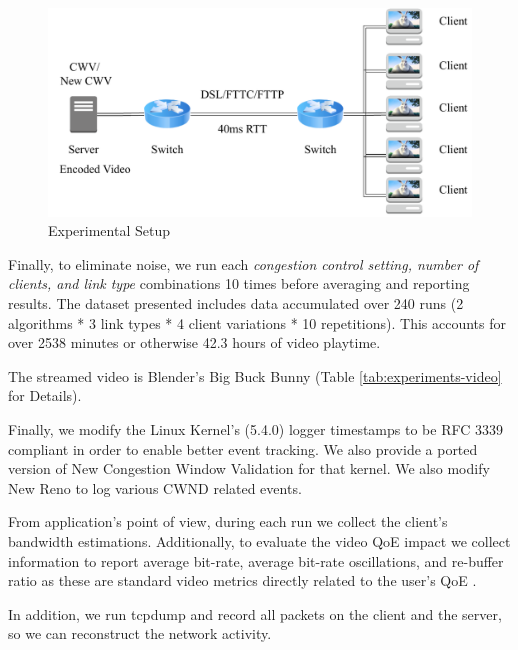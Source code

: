 \documentclass[10pt,sigconf]{acmart}
\begin{document}
\begin{figure}
  \centering
  \includegraphics[width=.5\textwidth]{figures/setup.pdf}
  \caption{Experimental Setup}
  \label{fig:experimental-setup}
\end{figure}

Finally, to eliminate noise, we run each \textit{congestion control setting, number of clients, and link type} combinations 10 times before averaging and reporting results. The dataset presented includes data accumulated over 240 runs (2 algorithms * 3 link types * 4 client variations * 10 repetitions). This accounts for over 2538 minutes or otherwise 42.3 hours of video playtime.

The streamed video is Blender's Big Buck Bunny \cite{online-bbb} (Table \ref{tab:experiments-video} for Details).

Finally, we modify the Linux Kernel's (5.4.0) logger timestamps to be RFC 3339 compliant in order to enable better event tracking. We also provide a ported version of New Congestion Window Validation \cite{rfc7661-2015-fairhurst-new-cwnd-validation} for that kernel. We also modify New Reno to log various CWND related events.

From application's point of view, during each run we collect the client's bandwidth estimations. Additionally, to evaluate the video QoE impact we collect information to report average bit-rate, average bit-rate oscillations, and re-buffer ratio as these are standard video metrics directly related to the user's QoE \cite{Spiteri-2019-from-theory-to-practice-sabre, Yin-2015-a-control-theoritic-approach, Dobrian-2013-understanding-the-impact-of-video-quality}.

In addition, we run tcpdump and record all packets on the client and the server, so we can reconstruct the network activity.


\end{document}
